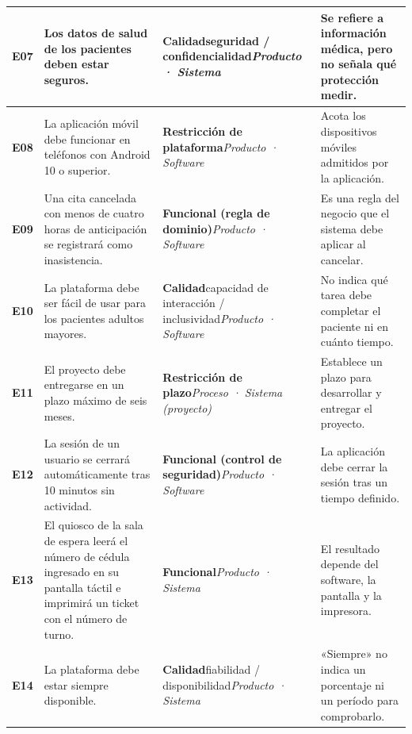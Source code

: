 \documentclass[10pt,a4paper,onecolumn]{IEEEtran}
\begin{document}
\begin{longtable}{@{}>{\raggedright\arraybackslash}p{.8cm}>{\raggedright\arraybackslash}p{5.25cm}>{\raggedright\arraybackslash}p{4.55cm}>{\raggedright\arraybackslash}p{4.55cm}@{}}
\textbf{E07} & Los datos de salud de los pacientes deben estar seguros. & \textbf{Calidad}\newline seguridad / confidencialidad\newline \emph{Producto · Sistema} & Se refiere a información médica, pero no señala qué protección medir. \\ \midrule
\textbf{E08} & La aplicación móvil debe funcionar en teléfonos con Android 10 o superior. & \textbf{Restricción de plataforma}\newline \emph{Producto · Software} & Acota los dispositivos móviles admitidos por la aplicación. \\ \midrule
\textbf{E09} & Una cita cancelada con menos de cuatro horas de anticipación se registrará como inasistencia. & \textbf{Funcional (regla de dominio)}\newline \emph{Producto · Software} & Es una regla del negocio que el sistema debe aplicar al cancelar. \\ \midrule
\textbf{E10} & La plataforma debe ser fácil de usar para los pacientes adultos mayores. & \textbf{Calidad}\newline capacidad de interacción / inclusividad\newline \emph{Producto · Software} & No indica qué tarea debe completar el paciente ni en cuánto tiempo. \\ \midrule
\textbf{E11} & El proyecto debe entregarse en un plazo máximo de seis meses. & \textbf{Restricción de plazo}\newline \emph{Proceso · Sistema (proyecto)} & Establece un plazo para desarrollar y entregar el proyecto. \\ \midrule
\textbf{E12} & La sesión de un usuario se cerrará automáticamente tras 10 minutos sin actividad. & \textbf{Funcional (control de seguridad)}\newline \emph{Producto · Software} & La aplicación debe cerrar la sesión tras un tiempo definido. \\ \midrule
\textbf{E13} & El quiosco de la sala de espera leerá el número de cédula ingresado en su pantalla táctil e imprimirá un ticket con el número de turno. & \textbf{Funcional}\newline \emph{Producto · Sistema} & El resultado depende del software, la pantalla y la impresora. \\ \midrule
\textbf{E14} & La plataforma debe estar siempre disponible. & \textbf{Calidad}\newline fiabilidad / disponibilidad\newline \emph{Producto · Sistema} & «Siempre» no indica un porcentaje ni un período para comprobarlo. \\ \midrule

\end{longtable}
\end{document}
